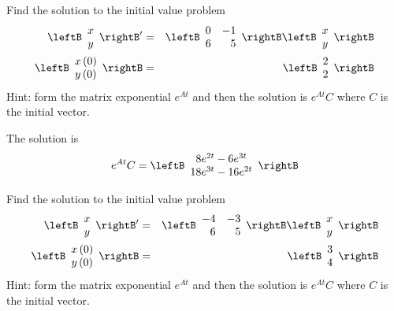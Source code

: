 \begin{enumialphparenastyle}

\begin{ex}
Find the solution to the initial value problem 
\begin{eqnarray*}
\leftB 
\begin{array}{c}
x \\ 
y 
\end{array} 
\rightB ^{\prime } &=&\leftB 
\begin{array}{rr}
0 & -1 \\ 
6 & 5 
\end{array} 
\rightB \leftB 
\begin{array}{c}
x \\ 
y 
\end{array} 
\rightB \\
\leftB 
\begin{array}{c}
x\left( 0\right) \\ 
y\left( 0\right) 
\end{array} 
\rightB &=&\leftB 
\begin{array}{r}
2 \\ 
2 
\end{array} 
\rightB
\end{eqnarray*} 
Hint: form the matrix exponential $e^{At}$ and then the solution is $e^{At}C$ where $C$ is the initial vector. 
\begin{sol}
The solution is 
\[
e^{At}C = \leftB 
\begin{array}{c}
8e^{2t} - 6e^{3t} \\
18e^{3t} - 16e^{2t}
\end{array}
\rightB
\]
\end{sol}
\end{ex}


\begin{ex}
 Find the solution to the initial value problem 
\begin{eqnarray*}
\leftB 
\begin{array}{c}
x \\ 
y 
\end{array} 
\rightB ^{\prime } &=&\leftB 
\begin{array}{rr}
-4 & -3 \\ 
6 & 5 
\end{array} 
\rightB \leftB 
\begin{array}{c}
x \\ 
y 
\end{array} 
\rightB \\
\leftB 
\begin{array}{c}
x\left( 0\right) \\ 
y\left( 0\right) 
\end{array} 
\rightB &=&\leftB 
\begin{array}{r}
3 \\ 
4 
\end{array} 
\rightB
\end{eqnarray*} 
Hint: form the matrix exponential $e^{At}$ and then the solution is $e^{At}C$ where $C$ is the initial vector. 
\end{ex}


\end{enumialphparenastyle}
